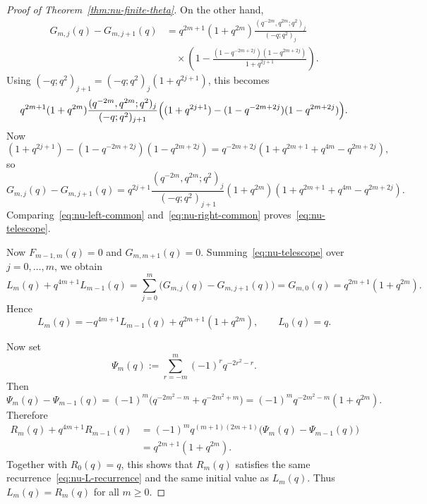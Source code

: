 \documentclass[10pt,a4paper]{amsart}
\begin{document}
\begin{proof}[Proof of Theorem~\ref{thm:nu-finite-theta}]
On the other hand,
\begin{align*}
G_{m,j}(q)-G_{m,j+1}(q)
&=
q^{2m+1}(1+q^{2m})
\frac{(q^{-2m},q^{2m};q^2)_j}{(-q;q^2)_j}\\
&\quad\times
\left(
1-\frac{(1-q^{-2m+2j})(1-q^{2m+2j})}{1+q^{2j+1}}
\right).
\end{align*}
Using $(-q;q^2)_{j+1}=(-q;q^2)_j(1+q^{2j+1})$, this becomes
\[
q^{2m+1}(1+q^{2m})
\frac{(q^{-2m},q^{2m};q^2)_j}{(-q;q^2)_{j+1}}
\Bigl((1+q^{2j+1})-(1-q^{-2m+2j})(1-q^{2m+2j})\Bigr).
\]
Now
\[
(1+q^{2j+1})-(1-q^{-2m+2j})(1-q^{2m+2j})
=
q^{-2m+2j}(1+q^{2m+1}+q^{4m}-q^{2m+2j}),
\]
so
\begin{equation}\label{eq:nu-right-common}
G_{m,j}(q)-G_{m,j+1}(q)
=
q^{2j+1}\frac{(q^{-2m},q^{2m};q^2)_j}{(-q;q^2)_{j+1}}
(1+q^{2m})(1+q^{2m+1}+q^{4m}-q^{2m+2j}).
\end{equation}
Comparing~\eqref{eq:nu-left-common} and~\eqref{eq:nu-right-common} proves~\eqref{eq:nu-telescope}.

Now $F_{m-1,m}(q)=0$ and $G_{m,m+1}(q)=0$. Summing~\eqref{eq:nu-telescope} over $j=0,\dots,m$, we obtain
\[
L_m(q)+q^{4m+1}L_{m-1}(q)
=
\sum_{j=0}^{m}\bigl(G_{m,j}(q)-G_{m,j+1}(q)\bigr)
=
G_{m,0}(q)
=
q^{2m+1}(1+q^{2m}).
\]
Hence
\begin{equation}\label{eq:nu-L-recurrence}
L_m(q)=-q^{4m+1}L_{m-1}(q)+q^{2m+1}(1+q^{2m}),
\qquad
L_0(q)=q.
\end{equation}

Now set
\[
\Psi_m(q):=\sum_{r=-m}^{m}(-1)^r q^{-2r^2-r}.
\]
Then
\[
\Psi_m(q)-\Psi_{m-1}(q)
=
(-1)^m\bigl(q^{-2m^2-m}+q^{-2m^2+m}\bigr)
=
(-1)^m q^{-2m^2-m}(1+q^{2m}).
\]
Therefore
\begin{align*}
R_m(q)+q^{4m+1}R_{m-1}(q)
&=
(-1)^m q^{(m+1)(2m+1)}\bigl(\Psi_m(q)-\Psi_{m-1}(q)\bigr)\\
&=
q^{2m+1}(1+q^{2m}).
\end{align*}
Together with $R_0(q)=q$, this shows that $R_m(q)$ satisfies the same recurrence~\eqref{eq:nu-L-recurrence} and the same initial value as $L_m(q)$. Thus $L_m(q)=R_m(q)$ for all $m\ge 0$.
\end{proof}
\end{document}
